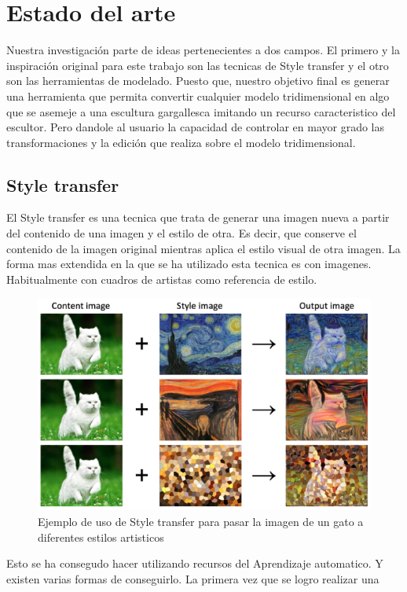 \chapter{Estado del arte}

Nuestra investigación parte de ideas pertenecientes a dos campos. El primero y la inspiración original para este
trabajo son las tecnicas de Style transfer y el otro son las herramientas de modelado. Puesto que,
nuestro objetivo final es generar una herramienta que permita convertir cualquier modelo tridimensional en algo que
se asemeje a una escultura gargallesca imitando un recurso caracteristico del escultor. Pero dandole al usuario la capacidad
de controlar en mayor grado las transformaciones y la edición que realiza sobre el modelo tridimensional.

\section{Style transfer}
El Style transfer es una tecnica que trata de generar una imagen nueva a partir del contenido de una imagen y el estilo de otra. Es decir, que
conserve el contenido de la imagen original mientras aplica el estilo visual de otra imagen.\cite{paperswithcodePapersWith} La forma mas extendida
en la que se ha utilizado esta tecnica es con imagenes. Habitualmente con cuadros de artistas como referencia de estilo. 
\begin{figure}
    \centering
    \includegraphics[width=\textwidth]{imagenes/style-transfer-example.jpg}
    \caption[Ejemplo de uso de Style Transfer]{Ejemplo de uso de Style transfer para pasar la imagen de un gato a diferentes estilos artisticos}
\end{figure}
Esto se ha consegudo hacer utilizando recursos del Aprendizaje automatico. Y existen varias formas de conseguirlo. La primera vez que se logro realizar una
